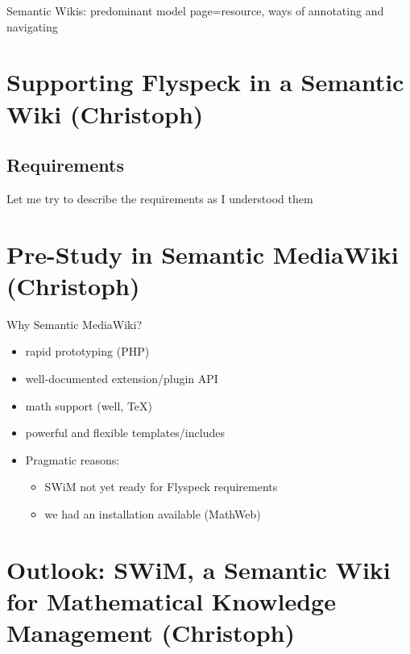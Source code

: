 \documentclass{llncs}
\begin{document}
Semantic Wikis: predominant model page=resource, ways of annotating and navigating

\section{Supporting Flyspeck in a Semantic Wiki (Christoph)}

\subsection{Requirements}
\label{sec:req}



\begin{newpart}{Let me try to describe the requirements as I understood them}
  
\end{newpart}

\section{Pre-Study in Semantic MediaWiki (Christoph)}
\label{sec:smw-study}

Why Semantic MediaWiki?
\begin{itemize}
\item rapid prototyping (PHP)
\item well-documented extension/plugin API
\item math support (well, \TeX)
\item powerful and flexible templates/includes
\item Pragmatic reasons:
  \begin{itemize}
  \item SWiM not yet ready for Flyspeck requirements
  \item we had an installation available (MathWeb)
  \end{itemize}
\end{itemize}


\section{Outlook: SWiM, a Semantic Wiki for Mathematical Knowledge Management (Christoph)}
\label{sec:swim}
\end{document}
